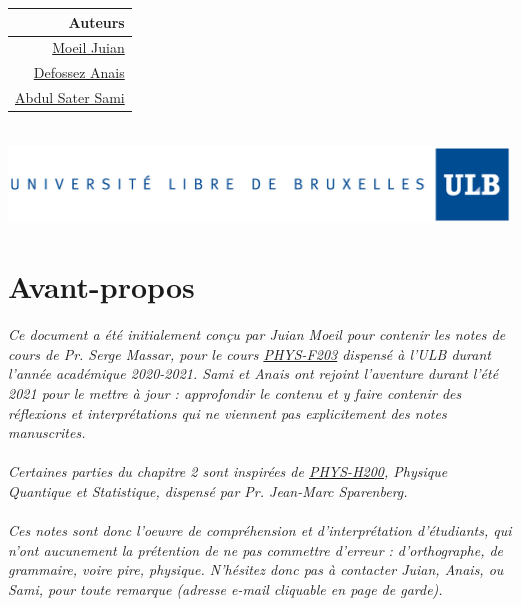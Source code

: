 \documentclass{book}
\numberwithin{equation}{part}
\begin{document}
\begin{titlepage}
\begin{minipage}{\linewidth}
\begin{minipage}{0.45\linewidth}
\begin{center}
            \end{center}
        \end{minipage}
        \begin{minipage}{0.5\linewidth}
            \begin{flushright}
                \begin{tabular}{r}
                    Auteurs \\
                    \hline
                    \href{mailto:juian.moeil@ulb.be}{Moeil Juian} \\
                    \href{mailto:anais.defossez@ulb.be}{Defossez Anais} \\
                    \href{mailto:sami.abdul.sater@ulb.be}{Abdul Sater Sami}
                \end{tabular}
            \end{flushright}
        \end{minipage}
    \end{minipage}
    \\
    \vfill
    \includegraphics[scale=0.5]{Images/ULB.jpg} \\
\end{titlepage}
\makeatother

\chapter*{Avant-propos}
\textit{Ce document a été initialement conçu par Juian Moeil pour contenir les notes de cours de Pr. Serge Massar, pour le cours \href{https://www.ulb.be/fr/programme/phys-f203}{PHYS-F203} dispensé à l'ULB durant l'année académique 2020-2021. Sami et Anais ont rejoint l'aventure durant l'été 2021 pour le mettre à jour : approfondir le contenu et y faire contenir des réflexions et interprétations qui ne viennent pas explicitement des notes manuscrites. \\ \\
Certaines parties du chapitre 2 sont inspirées de \href{https://www.ulb.be/fr/programme/phys-h200}{PHYS-H200}, \textit{Physique Quantique et Statistique}, dispensé par Pr. Jean-Marc Sparenberg. \\ \\
Ces notes sont donc l'oeuvre de compréhension et d'interprétation d'étudiants, qui n'ont aucunement la prétention de ne pas commettre d'erreur : d'orthographe, de grammaire, voire pire, physique. N'hésitez donc pas à contacter Juian, Anais, ou Sami, pour toute remarque (adresse e-mail cliquable en page de garde).
} \\
\end{document}

